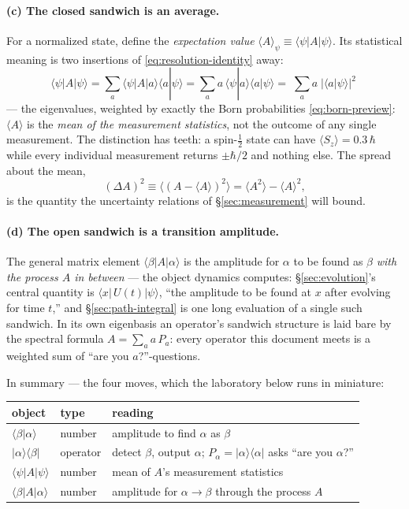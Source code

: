 \documentclass[11pt]{article}
\theoremstyle{plain}
\theoremstyle{definition}
\theoremstyle{remark}
\newcommand{\ket}[1]{\lvert #1 \rangle}
\newcommand{\bra}[1]{\langle #1 \rvert}
\newcommand{\braket}[2]{\langle #1 | #2 \rangle}
\begin{document}
\paragraph{(c) The closed sandwich is an average.} For a normalized
state, define the \emph{expectation value}
$\langle A\rangle_\psi \equiv \bra\psi A\ket\psi$. Its statistical
meaning is two insertions of \eqref{eq:resolution-identity} away:
\begin{equation}
  \bra\psi A\ket\psi
  = \sum_{a}\bra\psi A\ket a\braket a\psi
  = \sum_{a} a\,\braket\psi a\braket a\psi
  = \boxed{\;\sum_{a} a\;\bigl|\braket a\psi\bigr|^{2}\;}
  \label{eq:expectation}
\end{equation}
--- the eigenvalues, weighted by exactly the Born probabilities
\eqref{eq:born-preview}: $\langle A\rangle$ is the \emph{mean of the
measurement statistics}, not the outcome of any single measurement.
The distinction has teeth: a spin-$\tfrac12$ state can have
$\langle S_z\rangle = 0.3\,\hbar$ while every individual measurement
returns $\pm\hbar/2$ and nothing else. The spread about the mean,
\begin{equation}
  (\Delta A)^2
  \equiv \bigl\langle (A - \langle A\rangle)^2 \bigr\rangle
  = \langle A^2\rangle - \langle A\rangle^2 ,
  \label{eq:variance}
\end{equation}
is the quantity the uncertainty relations of
\S\ref{sec:measurement} will bound.

\paragraph{(d) The open sandwich is a transition amplitude.} The
general matrix element $\bra\beta A\ket\alpha$ is the amplitude for
$\alpha$ to be found as $\beta$ \emph{with the process $A$ in
between} --- the object dynamics computes: \S\ref{sec:evolution}'s
central quantity is $\bra{x}\,U(t)\ket\psi$, ``the amplitude to be
found at $x$ after evolving for time $t$,'' and
\S\ref{sec:path-integral} is one long evaluation of a single such
sandwich. In its own eigenbasis an operator's sandwich structure is
laid bare by the spectral formula $A = \sum_a a\,P_a$: every
operator this document meets is a weighted sum of ``are you
$a$?''-questions.

\medskip
\noindent
In summary --- the four moves, which the laboratory below runs in
miniature:
\begin{center}
\begin{tabular}{lll}
\toprule
object & type & reading \\
\midrule
$\braket\beta\alpha$ & number & amplitude to find $\alpha$ as $\beta$ \\
$\ket\alpha\bra\beta$ & operator & detect $\beta$, output $\alpha$;
$P_\alpha = \ket\alpha\bra\alpha$ asks ``are you $\alpha$?'' \\
$\bra\psi A\ket\psi$ & number & mean of $A$'s measurement statistics \\
$\bra\beta A\ket\alpha$ & number & amplitude for $\alpha \to \beta$
through the process $A$ \\
\bottomrule
\end{tabular}
\end{center}
\end{document}
